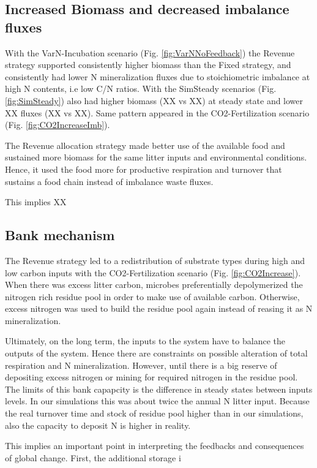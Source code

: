 \subsection{Increased Biomass and decreased imbalance fluxes}
With the VarN-Incubation scenario (Fig.
\ref{fig:VarNNoFeedback}) the Revenue strategy supported consistently higher
biomass than the Fixed strategy, and consistently had lower N mineralization
fluxes due to stoichiometric imbalance at high N contents, i.e low C/N ratios.
With the SimSteady scenarios (Fig. \ref{fig:SimSteady}) also had higher biomass
(XX vs XX) at steady state and lower XX fluxes (XX vs XX). Same pattern appeared
in the CO2-Fertilization scenario (Fig. \ref{fig:CO2IncreaseImb}).

The Revenue allocation strategy made better use of the available
food and sustained more biomass for the same litter inputs and environmental
conditions. Hence, it used the food more for productive respiration and turnover
that sustains a food chain instead of imbalance waste fluxes.  

This implies XX

\subsection{Bank mechanism}
The Revenue strategy led to a redistribution of substrate types during high
and low carbon inputs with the  CO2-Fertilization scenario (Fig.
\ref{fig:CO2Increase}). When there was excess litter carbon, microbes
preferentially depolymerized the nitrogen rich residue pool in order to make use of available
carbon. Otherwise, excess nitrogen was used to build the residue pool again
instead of reasing it as N mineralization.
 
Ultimately, on the long term, the inputs to the system have to balance the
outputs of the system. Hence there are constraints on possible alteration of
total respiration and N mineralization. However, until there is a big reserve of
depositing excess nitrogen or mining for required nitrogen in the residue pool.
The limits of this bank capapcity is the difference in steady states between
inputs levels. In our simulations this was about twice the annual N
litter input. Because the real turnover time and stock of residue pool higher
than in our simulations, also the capacity to deposit N is higher in reality.

This implies an important point in interpreting the feedbacks and consequences
of global change.  First, the additional storage i






